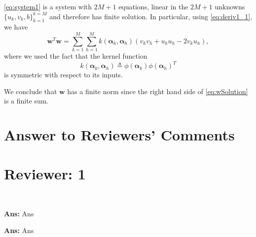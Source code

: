 \documentclass[draftcls,onecolumn,12pt]{IEEEtran}
\newcommand{\wrt}{with respect to }
\begin{document}
	\eqref{eq:system1} is a system with $2M + 1$ equations, linear in the $2M + 1$ unknowns $\{u_k,v_k,b\}_{k=1}^{k=M}$ and therefore has finite solution. In particular, using \eqref{eq:deriv1_1}, we have
	\begin{equation}
	\label{eq:wSolution}
	\bm{w}^T\bm{w} =  \sum_{k=1}^{M} \sum_{h=1}^{M} k(\bm{\alpha}_k,\bm{\alpha}_h) (v_kv_h + u_ku_h -2 v_ku_h),
	\end{equation}
	where we used the fact that the kernel function
	\begin{equation}
	k(\bm{\alpha}_k,\bm{\alpha}_h) \triangleq \phi(\bm{\alpha}_k) \phi(\bm{\alpha}_h)^T
	\end{equation}
	 is symmetric \wrt its inputs. 
	
	
	We conclude that $\bm{w}$ has a finite norm since the right hand side of \eqref{eq:wSolution} is a finite sum.
	  


%
%
\renewcommand*{\bibfont}{\footnotesize}

\printbibliography

\section*{Answer to Reviewers' Comments}
\section*{Reviewer: 1}

~



{\bf Ans:} Ans



{\bf Ans:} Ans


\end{document}
